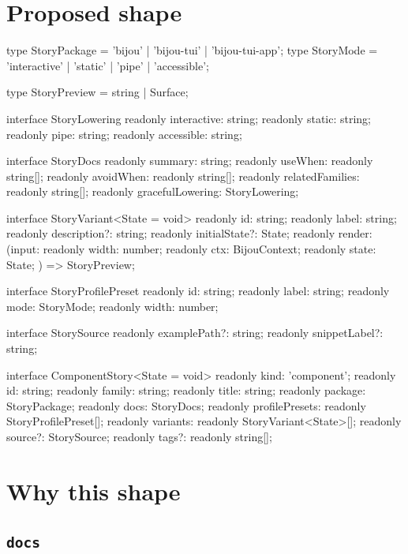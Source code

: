 \section{Proposed shape}\label{record-039-proposed-shape}

\begin{CodeBlock}
type StoryPackage = 'bijou' | 'bijou-tui' | 'bijou-tui-app';
type StoryMode = 'interactive' | 'static' | 'pipe' | 'accessible';

type StoryPreview = string | Surface;

interface StoryLowering {
  readonly interactive: string;
  readonly static: string;
  readonly pipe: string;
  readonly accessible: string;
}

interface StoryDocs {
  readonly summary: string;
  readonly useWhen: readonly string[];
  readonly avoidWhen: readonly string[];
  readonly relatedFamilies: readonly string[];
  readonly gracefulLowering: StoryLowering;
}

interface StoryVariant<State = void> {
  readonly id: string;
  readonly label: string;
  readonly description?: string;
  readonly initialState?: State;
  readonly render: (input: {
    readonly width: number;
    readonly ctx: BijouContext;
    readonly state: State;
  }) => StoryPreview;
}

interface StoryProfilePreset {
  readonly id: string;
  readonly label: string;
  readonly mode: StoryMode;
  readonly width: number;
}

interface StorySource {
  readonly examplePath?: string;
  readonly snippetLabel?: string;
}

interface ComponentStory<State = void> {
  readonly kind: 'component';
  readonly id: string;
  readonly family: string;
  readonly title: string;
  readonly package: StoryPackage;
  readonly docs: StoryDocs;
  readonly profilePresets: readonly StoryProfilePreset[];
  readonly variants: readonly StoryVariant<State>[];
  readonly source?: StorySource;
  readonly tags?: readonly string[];
}
\end{CodeBlock}

\section{Why this shape}\label{record-039-why-this-shape}

\subsection{\texorpdfstring{\texttt{d\allowbreak{}o\allowbreak{}c\allowbreak{}s}}{}}\label{record-039-docs}

